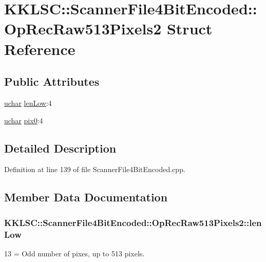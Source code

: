 \hypertarget{struct_scanner_file4_bit_encoded_1_1_op_rec_raw513_pixels2}{}\section{K\+K\+L\+SC\+:\+:Scanner\+File4\+Bit\+Encoded\+:\+:Op\+Rec\+Raw513\+Pixels2 Struct Reference}
\label{struct_scanner_file4_bit_encoded_1_1_op_rec_raw513_pixels2}
\subsection*{Public Attributes}
\begin{DoxyCompactItemize}
\item 
\hyperlink{namespace_k_k_b_ace9969169bf514f9ee6185186949cdf7}{uchar} \hyperlink{struct_scanner_file4_bit_encoded_1_1_op_rec_raw513_pixels2_abe866a0900444336c6d6d967daa3c546}{len\+Low}\+:4
\item 
\hyperlink{namespace_k_k_b_ace9969169bf514f9ee6185186949cdf7}{uchar} \hyperlink{struct_scanner_file4_bit_encoded_1_1_op_rec_raw513_pixels2_a5d2cc4010e6c277bbd39ebfd343e4494}{pix0}\+:4
\end{DoxyCompactItemize}


\subsection{Detailed Description}


Definition at line 139 of file Scanner\+File4\+Bit\+Encoded.\+cpp.



\subsection{Member Data Documentation}
\subsubsection[{\texorpdfstring{len\+Low}{lenLow}}]{ K\+K\+L\+S\+C\+::\+Scanner\+File4\+Bit\+Encoded\+::\+Op\+Rec\+Raw513\+Pixels2\+::len\+Low}\hypertarget{struct_scanner_file4_bit_encoded_1_1_op_rec_raw513_pixels2_abe866a0900444336c6d6d967daa3c546}{}\label{struct_scanner_file4_bit_encoded_1_1_op_rec_raw513_pixels2_abe866a0900444336c6d6d967daa3c546}
13 = Odd number of pixes, up to 513 pixels. 

